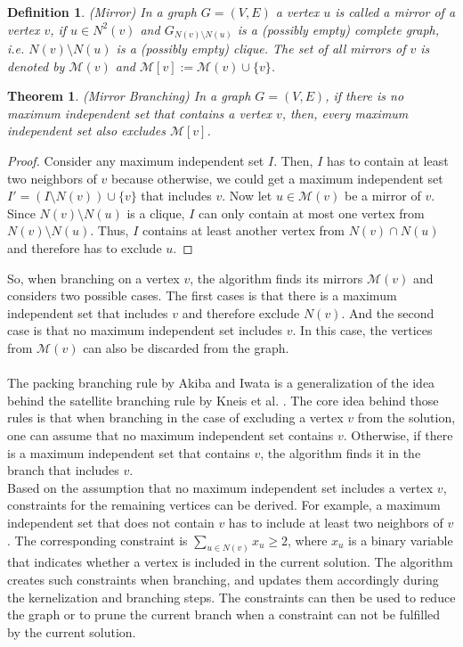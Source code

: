 \documentclass[]{article}
\newtheorem{theorem}{Theorem}
\newtheorem{definition}{Definition}
\begin{document}
\begin{definition} (Mirror)
	In a graph $G=(V,E)$ a vertex $u$ is called a mirror of a vertex $v$, if $u\in N^2(v)$ and $G_{N(v)\setminus N(u)}$ is a (possibly empty) complete graph, i.e. $N(v)\setminus N(u)$ is a (possibly empty) clique. The set of all mirrors of $v$ is denoted by $\mathcal{M}(v)$ and $\mathcal{M}[v] := \mathcal{M}(v)\cup\{v\}$.
\end{definition} 
\begin{theorem} (Mirror Branching)
	In a graph $G=(V,E)$, if there is no maximum independent set that contains a vertex $v$, then, every maximum independent set also excludes $\mathcal{M}[v]$.
\end{theorem}
\begin{proof}
	Consider any maximum independent set $I$. Then, $I$ has to contain at least two neighbors of $v$ because otherwise, we could get a maximum independent set $I'=(I\setminus N(v))\cup\{v\}$ that includes $v$. Now let $u\in\mathcal{M}(v)$ be a mirror of $v$. Since $N(v)\setminus N(u)$ is a clique, $I$ can only contain at most one vertex from $N(v)\setminus N(u)$. Thus, $I$ contains at least another vertex from $N(v)\cap N(u)$ and therefore has to exclude $u$.
\end{proof}

So, when branching on a vertex $v$, the algorithm finds its mirrors $\mathcal{M}(v)$ and considers two possible cases. The first cases is that there is a maximum independent set that includes $v$ and therefore exclude $N(v)$. And the second case is that no maximum independent set includes $v$. In this case, the vertices from $\mathcal{M}(v)$ can also be discarded from the graph.\paragraph{}
The packing branching rule by Akiba and Iwata \cite{AkibaIwata} is a generalization of the idea behind the satellite branching rule by Kneis et al. \cite{Kneis}. The core idea behind those rules is that when branching in the case of excluding a vertex $v$ from the solution, one can assume that no maximum independent set contains $v$. Otherwise, if there is a maximum independent set that contains $v$, the algorithm finds it in the branch that includes $v$.\\
Based on the assumption that no maximum independent set includes a vertex $v$, constraints for the remaining vertices can be derived. For example, a maximum independent set that does not contain $v$ has to include at least two neighbors of $v$. The corresponding constraint is $\sum_{u\in N(v)}x_u \geq2$, where $x_u$ is a binary variable that indicates whether a vertex is included in the current solution. The algorithm creates such constraints when branching, and updates them accordingly during the kernelization and branching steps. The constraints can then be used to reduce the graph or to prune the current branch when a constraint can not be fulfilled by the current solution.
\end{document}
